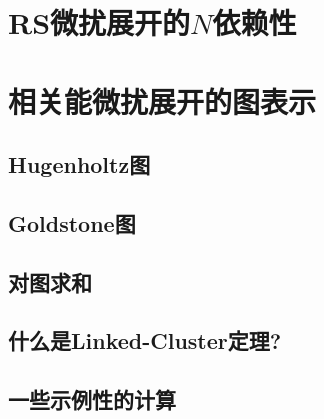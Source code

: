 %
\section{RS微扰展开的$N$依赖性}
\section{相关能微扰展开的图表示}
\subsection{Hugenholtz图}
\subsection{Goldstone图}
\subsection{对图求和}
\subsection{什么是Linked-Cluster定理?}
\subsection{一些示例性的计算}